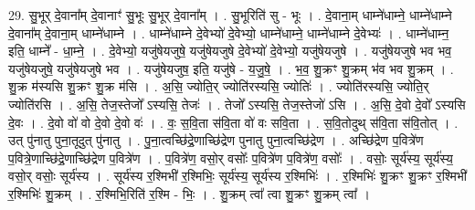 \documentclass[17pt]{extarticle}
\begin{document}
29. सु॒भूर् दे॒वाना᳚म् दे॒वानाꣳ॑ सु॒भूः सु॒भूर् दे॒वाना᳚म् । . सु॒भूरिति॑ सु - भूः । . दे॒वाना॒म् धाम्ने॑धाम्ने॒ धाम्ने॑धाम्ने दे॒वाना᳚म् दे॒वाना॒म् धाम्ने॑धाम्ने । . धाम्ने॑धाम्ने दे॒वेभ्यो॑ दे॒वेभ्यो॒ धाम्ने॑धाम्ने॒ धाम्ने॑धाम्ने दे॒वेभ्यः॑ । . धाम्ने॑धाम्न॒ इति॒ धाम्ने᳚ - धा॒म्ने॒ । . दे॒वेभ्यो॒ यजु॑षेयजुषे॒ यजु॑षेयजुषे दे॒वेभ्यो॑ दे॒वेभ्यो॒ यजु॑षेयजुषे । . यजु॑षेयजुषे भव भव॒ यजु॑षेयजुषे॒ यजु॑षेयजुषे भव । . यजु॑षेयजुष॒ इति॒ यजु॑षे - य॒जु॒षे॒ । . भ॒व॒ शु॒क्रꣳ शु॒क्रम् भ॑व भव शु॒क्रम् । . शु॒क्र म॑स्यसि शु॒क्रꣳ शु॒क्र म॑सि । . अ॒सि॒ ज्योति॒र् ज्योति॑रस्यसि॒ ज्योतिः॑ । . ज्योति॑रस्यसि॒ ज्योति॒र् ज्योति॑रसि । . अ॒सि॒ तेज॒स्तेजो᳚ ऽस्यसि॒ तेजः॑ । . तेजो᳚ ऽस्यसि॒ तेज॒स्तेजो॑ ऽसि । . अ॒सि॒ दे॒वो दे॒वो᳚ ऽस्यसि दे॒वः । . दे॒वो वो॑ वो दे॒वो दे॒वो वः॑ । . वः॒ स॒वि॒ता स॑वि॒ता वो॑ वः सवि॒ता । . स॒वि॒तोदुथ् स॑वि॒ता स॑वि॒तोत् । . उत् पु॑नातु पुना॒तूदुत् पु॑नातु । . पु॒ना॒त्वच्छि॑द्रे॒णाच्छि॑द्रेण पुनातु पुना॒त्वच्छि॑द्रेण । . अच्छि॑द्रेण प॒वित्रे॑ण प॒वित्रे॒णाच्छि॑द्रे॒णाच्छि॑द्रेण प॒वित्रे॑ण । . प॒वित्रे॑ण॒ वसो॒र् वसोः᳚ प॒वित्रे॑ण प॒वित्रे॑ण॒ वसोः᳚ । . वसोः॒ सूर्य॑स्य॒ सूर्य॑स्य॒ वसो॒र् वसोः॒ सूर्य॑स्य । . सूर्य॑स्य र॒श्मिभी॑ र॒श्मिभिः॒ सूर्य॑स्य॒ सूर्य॑स्य र॒श्मिभिः॑ । . र॒श्मिभिः॑ शु॒क्रꣳ शु॒क्रꣳ र॒श्मिभी॑ र॒श्मिभिः॑ शु॒क्रम् । . र॒श्मिभि॒रिति॑ र॒श्मि - भिः॒ । . शु॒क्रम् त्वा᳚ त्वा शु॒क्रꣳ शु॒क्रम् त्वा᳚ । \newline
\end{document}
